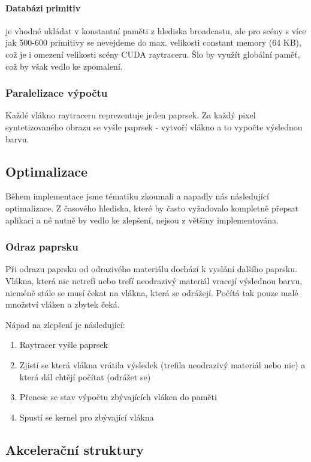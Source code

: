 \documentclass[12pt,a4paper,titlepage,final]{report}
\begin{document}
\paragraph{Databázi primitiv} je vhodné ukládat v konstantní paměti z hlediska broadcastu, ale pro scény s více jak 500-600 primitivy se nevejdeme do max. velikosti constant memory (64 KB), což je i omezení velikosti scény CUDA raytraceru. Šlo by využít globální paměť, což by však vedlo ke zpomalení.

\subsubsection{Paralelizace výpočtu}

Každé vlákno raytraceru reprezentuje jeden paprsek. Za každý pixel syntetizovaného obrazu se vyšle paprsek - vytvoří vlákno a to vypočte výslednou barvu.

\subsection{Optimalizace}

Během implementace jsme tématiku zkoumali a napadly nás následující optimalizace. Z časového hlediska, které by často vyžadovalo kompletně přepsat aplikaci a né nutně by vedlo ke zlepšení, nejsou z většiny implementována.

\subsubsection{Odraz paprsku} 

Při odrazu paprsku od odrazivého materiálu dochází k vyslání dalšího paprsku. Vlákna, která nic netrefí nebo trefí neodrazivý materiál vracejí výslednou barvu, nicméně stále se musí čekat na vlákna, která se odrážejí. Počítá tak pouze malé množství vláken a zbytek čeká. 

Nápad na zlepšení je následující:
\begin{enumerate}
	\item Raytracer vyšle paprsek
	\item Zjistí se která vlákna vrátila výsledek (trefila neodrazivý materiál nebo nic) a která dál chtějí počítat (odrážet se)
	\item Přenese se stav výpočtu zbývajících vláken do paměti
	\item Spustí se kernel pro zbývající vlákna 
\end{enumerate}

\subsection{Akcelerační struktury}
\end{document}
